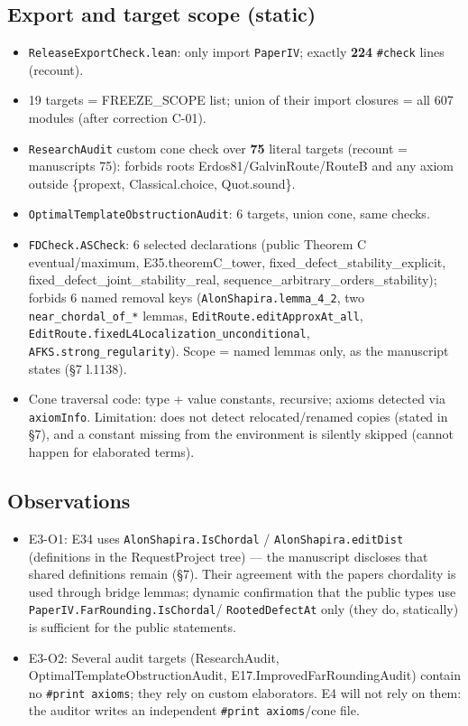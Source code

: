 \documentclass[
]{article}
\providecommand{\tightlist}{%
  \setlength{\itemsep}{0pt}\setlength{\parskip}{0pt}}
\begin{document}
\subsection{Export and target scope
(static)}\label{export-and-target-scope-static}

\begin{itemize}
\tightlist
\item
  \texttt{ReleaseExportCheck.lean}: only import \texttt{PaperIV};
  exactly \textbf{224} \texttt{\#check} lines (recount).
\item
  19 targets = FREEZE\_SCOPE list; union of their import closures = all
  607 modules (after correction C-01).
\item
  \texttt{ResearchAudit} custom cone check over \textbf{75} literal
  targets (recount = manuscript\textquotesingle s 75): forbids roots
  Erdos81/GalvinRoute/RouteB and any axiom outside \{propext,
  Classical.choice, Quot.sound\}.
\item
  \texttt{OptimalTemplateObstructionAudit}: 6 targets, union cone, same
  checks.
\item
  \texttt{FDCheck.ASCheck}: 6 selected declarations (public Theorem C
  eventual/maximum, E35.theoremC\_tower,
  fixed\_defect\_stability\_explicit,
  fixed\_defect\_joint\_stability\_real,
  sequence\_arbitrary\_orders\_stability); forbids 6 named removal keys
  (\texttt{AlonShapira.lemma\_4\_2}, two \texttt{near\_chordal\_of\_*}
  lemmas, \texttt{EditRoute.editApproxAt\_all},
  \texttt{EditRoute.fixedL4Localization\_unconditional},
  \texttt{AFKS.strong\_regularity}). Scope = named lemmas only, as the
  manuscript states (§7 l.1138).
\item
  Cone traversal code: type + value constants, recursive; axioms
  detected via \texttt{axiomInfo}. Limitation: does not detect
  relocated/renamed copies (stated in §7), and a constant missing from
  the environment is silently skipped (cannot happen for elaborated
  terms).
\end{itemize}

\subsection{Observations}\label{observations}

\begin{itemize}
\tightlist
\item
  E3-O1: E34 uses \texttt{AlonShapira.IsChordal} /
  \texttt{AlonShapira.editDist} (definitions in the RequestProject tree)
  --- the manuscript discloses that shared definitions remain (§7).
  Their agreement with the paper\textquotesingle s chordality is used
  through bridge lemmas; dynamic confirmation that the public types use
  \texttt{PaperIV.FarRounding.IsChordal}/ \texttt{RootedDefectAt} only
  (they do, statically) is sufficient for the public statements.
\item
  E3-O2: Several audit targets (ResearchAudit,
  OptimalTemplateObstructionAudit, E17.ImprovedFarRoundingAudit) contain
  no \texttt{\#print\ axioms}; they rely on custom elaborators. E4 will
  not rely on them: the auditor writes an independent
  \texttt{\#print\ axioms}/cone file.
\end{itemize}
\end{document}
